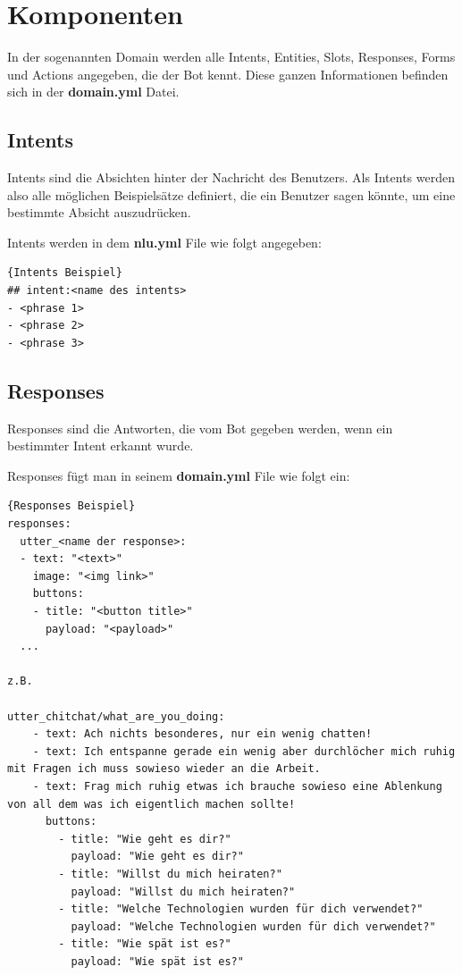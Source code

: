 \section{Komponenten}

In der sogenannten Domain werden alle Intents, Entities, Slots, Responses, Forms und Actions angegeben, die der Bot kennt.
Diese ganzen Informationen befinden sich in der \textbf{domain.yml} Datei.\cite{domain}

\subsection{Intents}\label{Intents}

Intents sind die Absichten hinter der Nachricht des Benutzers.
Als Intents werden also alle möglichen Beispielsätze definiert, die ein Benutzer sagen könnte, um eine bestimmte Absicht auszudrücken.\cite{intents}

Intents werden in dem \textbf{nlu.yml} File wie folgt angegeben:

\begin{lstlisting}[label={lst:intent-example},caption={Intents Beispiel}]{Intents Beispiel}
## intent:<name des intents>
- <phrase 1>
- <phrase 2>
- <phrase 3>
\end{lstlisting}

\subsection{Responses}

Responses sind die Antworten, die vom Bot gegeben werden, wenn ein bestimmter Intent erkannt wurde.\cite{responses}

Responses fügt man in seinem \textbf{domain.yml} File wie folgt ein:

\begin{lstlisting}[label={lst:responses-example},caption={Responses Beispiel}]{Responses Beispiel}
responses:
  utter_<name der response>:
  - text: "<text>"
    image: "<img link>"
    buttons:
    - title: "<button title>"
      payload: "<payload>"
  ...

z.B.

utter_chitchat/what_are_you_doing:
    - text: Ach nichts besonderes, nur ein wenig chatten!
    - text: Ich entspanne gerade ein wenig aber durchlöcher mich ruhig mit Fragen ich muss sowieso wieder an die Arbeit.
    - text: Frag mich ruhig etwas ich brauche sowieso eine Ablenkung von all dem was ich eigentlich machen sollte!
      buttons:
        - title: "Wie geht es dir?"
          payload: "Wie geht es dir?"
        - title: "Willst du mich heiraten?"
          payload: "Willst du mich heiraten?"
        - title: "Welche Technologien wurden für dich verwendet?"
          payload: "Welche Technologien wurden für dich verwendet?"
        - title: "Wie spät ist es?"
          payload: "Wie spät ist es?"
\end{lstlisting}

